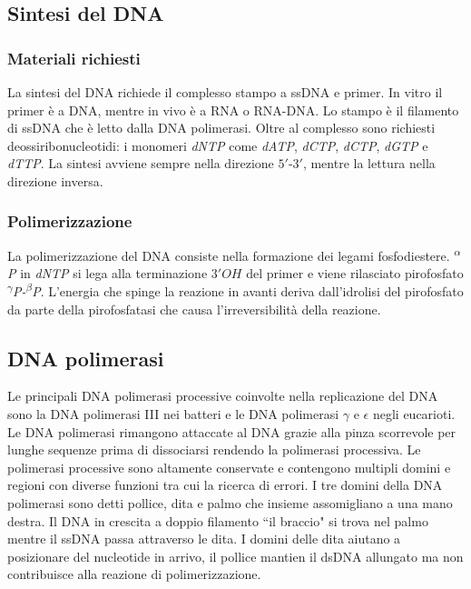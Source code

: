 \subsection{Sintesi del DNA}
\subsubsection{Materiali richiesti}
La sintesi del DNA richiede il complesso stampo a ssDNA e primer. In vitro il primer \`e a DNA, mentre in vivo \`e a RNA o RNA-DNA. Lo stampo \`e il filamento di ssDNA che \`e letto dalla
DNA polimerasi. Oltre al complesso sono richiesti deossiribonucleotidi: i monomeri \emph{dNTP} come \emph{dATP}, \emph{dCTP}, \emph{dCTP}, \emph{dGTP} e \emph{dTTP}. La sintesi avviene
sempre nella direzione $5'$-$3'$, mentre la lettura nella direzione inversa. 
\subsubsection{Polimerizzazione}
La polimerizzazione del DNA consiste nella formazione dei legami fosfodiestere. \emph{\textsuperscript{$\alpha$}P} in \emph{dNTP} si lega alla terminazione $3'OH$ del primer e viene 
rilasciato pirofosfato \emph{\textsuperscript{$\gamma$}P-\textsuperscript{$\beta$}P}. L'energia che spinge la reazione in avanti deriva dall'idrolisi del pirofosfato da parte della
pirofosfatasi che causa l'irreversibilit\`a della reazione.
\subsection{DNA polimerasi}
Le principali DNA polimerasi processive coinvolte nella replicazione del DNA sono la DNA polimerasi III nei batteri e le DNA polimerasi $\gamma$ e $\epsilon$ negli eucarioti. Le DNA
polimerasi rimangono attaccate al DNA grazie alla pinza scorrevole per lunghe sequenze prima di dissociarsi rendendo la polimerasi processiva. Le polimerasi processive sono altamente 
conservate e contengono multipli domini e regioni con diverse funzioni tra cui la ricerca di errori. I tre domini della DNA polimerasi sono detti pollice, dita e palmo che insieme 
assomigliano a una mano destra. Il DNA in crescita a doppio filamento ``il braccio" si trova nel palmo mentre il ssDNA passa attraverso le dita. I domini delle dita aiutano a posizionare
del nucleotide in arrivo, il pollice mantien il dsDNA allungato ma non contribuisce alla reazione di polimerizzazione. 
